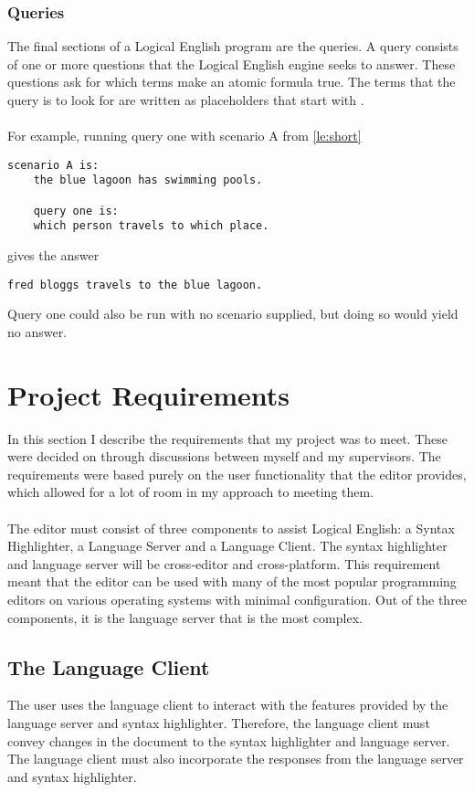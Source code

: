 \documentclass[../main.tex]{subfiles}
\begin{document}
\subsubsection{Queries}
The final sections of a Logical English program are the queries. A query consists of one or more questions that the Logical English engine seeks to answer. These questions ask for which terms make an atomic formula true. The terms that the query is to look for are written as placeholders that start with . 
\\
\\
For example, running query one with scenario A from \ref{le:short}
\begin{lstlisting}[language={LE}]
    scenario A is:
    the blue lagoon has swimming pools.

    query one is:
    which person travels to which place.
\end{lstlisting}
gives the answer
\begin{lstlisting}[language={LE}]
    fred bloggs travels to the blue lagoon.
\end{lstlisting}
Query one could also be run with no scenario supplied, but doing so would yield no answer.

\newpage
\section{Project Requirements}
In this section I describe the requirements that my project was to meet. These were decided on through discussions between myself and my supervisors. The requirements were based purely on the user functionality that the editor provides, which allowed for a lot of room in my approach to meeting them.
\\
\\
The editor must consist of three components to assist Logical English: a Syntax Highlighter, a Language Server and a Language Client. The syntax highlighter and language server will be cross-editor and cross-platform. This requirement meant that the editor can be used with many of the most popular programming editors on various operating systems with minimal configuration. Out of the three components, it is the language server that is the most complex.

\subsection{The Language Client}
The user uses the language client to interact with the features provided by the language server and syntax highlighter. Therefore, the language client must convey changes in the document to the syntax highlighter and language server. The language client must also incorporate the responses from the language server and syntax highlighter.
\end{document}
